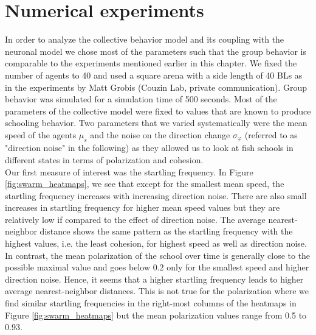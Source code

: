     \section{Numerical experiments}
    In order to analyze the collective behavior model and its coupling with the neuronal model we chose most of the parameters such that the group behavior is comparable to the experiments mentioned earlier in this chapter.
    We fixed the number of agents to 40 and used a square arena with a side length of 40 BLs as in the experiments by Matt Grobis (Couzin Lab, private communication).
    Group behavior was simulated for a simulation time of 500 seconds.
    Most of the parameters of the collective model were fixed to values that are known to produce schooling behavior.
    Two parameters that we varied systematically were the mean speed of the agents $\mu_{s}$ and the noise on the direction change $\sigma_{\varphi}$ (referred to as "direction noise" in the following) as they allowed us to look at fish schools in different states in terms of polarization and cohesion.\\
    Our first measure of interest was the startling frequency.
    In Figure \ref{fig:swarm_heatmaps}, we see that except for the smallest mean speed, the startling frequency increases with increasing direction noise.
    There are also small increases in startling frequency for higher mean speed values but they are relatively low if compared to the effect of direction noise.
    The average nearest-neighbor distance shows the same pattern as the startling frequency with the highest values, i.e. the least cohesion, for highest speed as well as direction noise.
    In contrast, the mean polarization of the school over time is generally close to the possible maximal value and goes below $0.2$ only for the smallest speed and higher direction noise.
    Hence, it seems that a higher startling frequency leads to higher average nearest-neighbor distances.
    This is not true for the polarization where we find similar startling frequencies in the right-most columns of the heatmaps in Figure \ref{fig:swarm_heatmaps} but the mean polarization values range from 0.5 to 0.93.\\

